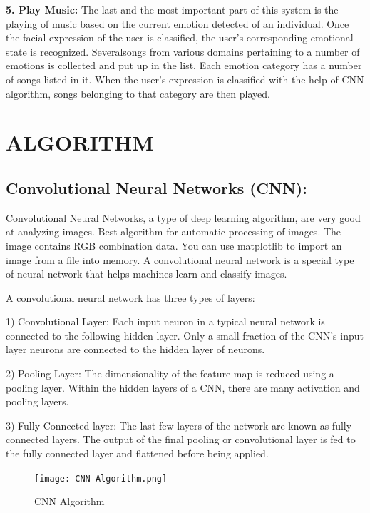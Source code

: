 \documentclass[12pt]{report}
\begin{document}
\textbf{5. Play Music:} The last and the most important part of this system is the playing of music
based on the current emotion detected of an individual. Once the facial expression of the 
user is classified, the user’s corresponding emotional state is recognized. Severalsongs
from various domains pertaining to a number of emotions is collected and put up in the 
list. Each emotion category has a number of songs listed in it. When the user’s
expression is classified with the help of CNN algorithm, songs belonging to that 
category are then played.


\clearpage
\centering
\section{ALGORITHM}

\justifying
\setlength{\parindent}{4em}
\setlength{\parskip}{0.5em}
\renewcommand{\baselinestretch}{1.5}
\normalsize
\subsection{ Convolutional Neural Networks (CNN):}
\hspace{1.7cm} Convolutional Neural Networks, a type of deep learning algorithm, are very good at analyzing 
images. Best algorithm for automatic processing of images. The image contains RGB 
combination data. You can use matplotlib to import an image from a file into memory. A 
convolutional neural network is a special type of neural network that helps machines learn and 
classify images. 

A convolutional neural network has three types of layers:

1) Convolutional Layer: Each input neuron in a typical neural network is connected to the 
following hidden layer. Only a small fraction of the CNN’s input layer neurons are connected 
to the hidden layer of neurons.

2) Pooling Layer: The dimensionality of the feature map is reduced using a pooling layer. 
Within the hidden layers of a CNN, there are many activation and pooling layers.

3) Fully-Connected layer: The last few layers of the network are known as fully connected 
layers. The output of the final pooling or convolutional layer is fed to the fully connected 
layer and flattened before being applied.

\begin{figure}[h]
\centering
\texttt{[image: CNN Algorithm.png]}
\caption{CNN Algorithm}
\label{CNN Algorithm}
\end{figure}
\end{document}
